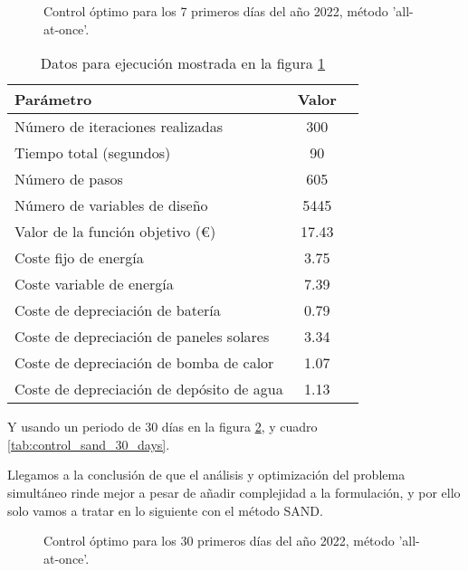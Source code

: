 \begin{figure}[h] \centering
	\centering
	
	\caption{Control óptimo para los 7 primeros días del año 2022, método 'all-at-once'.}
	\label{fig:control_sand_7_days}
\end{figure}

\begin{table}[ht]
	\centering
	\caption{Datos para ejecución mostrada en la figura \ref{fig:control_sand_7_days}}
	\label{tab:control_sand_7_days}
	\begin{tabular}{@{}lcc@{}}
		\toprule
		Parámetro                                 & Valor \\
		\midrule
		Número de iteraciones realizadas          & 300   \\
		Tiempo total (segundos)                   & 90    \\
		Número de pasos                           & 605   \\
		Número de variables de diseño             & 5445  \\
		\midrule
		Valor de la función objetivo (€)          & 17.43 \\
		\midrule
		Coste fijo de energía                     & 3.75  \\
		Coste variable de energía                 & 7.39  \\
		Coste de depreciación de batería          & 0.79  \\
		Coste de depreciación de paneles solares  & 3.34  \\
		Coste de depreciación de bomba de calor   & 1.07  \\
		Coste de depreciación de depósito de agua & 1.13  \\
		\bottomrule
	\end{tabular}
\end{table}

Y usando un periodo de 30 días en la figura \ref{fig:control_sand_30_days}, y
cuadro \ref{tab:control_sand_30_days}.

Llegamos a la conclusión de que el análisis y optimización del problema
simultáneo rinde mejor a pesar de añadir complejidad a la formulación, y por
ello solo vamos a tratar en lo siguiente con el método SAND.

\begin{figure}[h] \centering
	\centering
	
	\caption{Control óptimo para los 30 primeros días del año 2022, método 'all-at-once'.}
	\label{fig:control_sand_30_days}
\end{figure}

